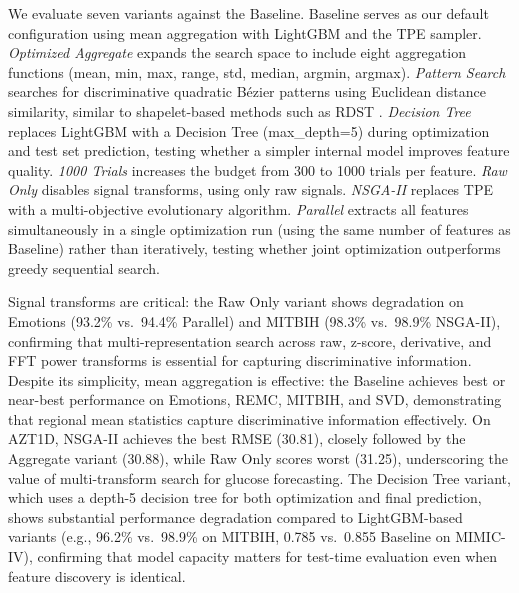 \documentclass[times, review, 10pt]{elsarticle}
\begin{document}
We evaluate seven variants against the Baseline. Baseline serves as our default configuration using mean aggregation with LightGBM and the TPE sampler.
\emph{Optimized Aggregate} expands the search space to include eight aggregation functions (mean, min, max, range, std, median, argmin, argmax). 
\emph{Pattern Search} searches for discriminative quadratic B\'ezier patterns using Euclidean distance similarity, similar to shapelet-based methods such as RDST \cite{guillaume2022random}.
\emph{Decision Tree} replaces LightGBM with a Decision Tree (max\_depth=5) during optimization and test set prediction, testing whether a simpler internal model improves feature quality. 
\emph{1000 Trials} increases the budget from 300 to 1000 trials per feature.
\emph{Raw Only} disables signal transforms, using only raw signals. \emph{NSGA-II} replaces TPE with a multi-objective evolutionary algorithm. 
\emph{Parallel} extracts all features simultaneously in a single optimization run (using the same number of features as Baseline) rather than iteratively, 
testing whether joint optimization outperforms greedy sequential search.

\begin{table}[H]
\centering
\caption{Ablation study across seven datasets (single fold;
Baseline scores may differ slightly from the multi-fold
averages in Table~\ref{tab:results}). Bold indicates best
score per dataset. Arrows indicate optimization direction
($\uparrow$ higher better, $\downarrow$ lower better).
Rows show metric, number of extracted features, and
runtime (s).}

\end{table}

Signal transforms are
critical: the Raw Only variant shows degradation on Emotions
(93.2\% vs.\ 94.4\% Parallel) and MITBIH (98.3\% vs.\
98.9\% NSGA-II), confirming that multi-representation
search across raw, z-score, derivative, and FFT power
transforms is essential for capturing discriminative
information. Despite its simplicity, mean aggregation is
effective: the Baseline achieves best or near-best
performance on Emotions, REMC, MITBIH, and SVD,
demonstrating that regional mean statistics capture
discriminative information effectively.
On AZT1D, NSGA-II achieves the best RMSE (30.81),
closely followed by the Aggregate variant (30.88),
while Raw Only scores worst (31.25), underscoring
the value of multi-transform search for glucose
forecasting.
The Decision Tree variant, which uses a depth-5 decision
tree for both optimization and final prediction, shows
substantial performance degradation compared to
LightGBM-based variants (e.g., 96.2\% vs.\ 98.9\% on
MITBIH, 0.785 vs.\ 0.855 Baseline on MIMIC-IV),
confirming that model capacity matters for test-time
evaluation even when feature discovery is identical.
\end{document}
